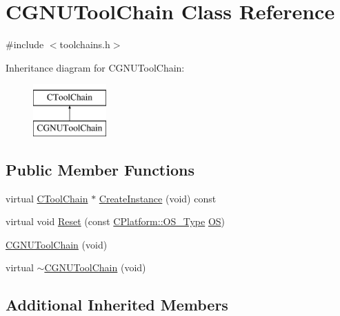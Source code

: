 \hypertarget{classCGNUToolChain}{\section{C\-G\-N\-U\-Tool\-Chain Class Reference}
\label{classCGNUToolChain}
}


{\ttfamily \#include $<$toolchains.\-h$>$}

Inheritance diagram for C\-G\-N\-U\-Tool\-Chain\-:\begin{figure}[H]
\begin{center}
\leavevmode
\includegraphics[height=2.000000cm]{d7/d26/classCGNUToolChain}
\end{center}
\end{figure}
\subsection*{Public Member Functions}
\begin{DoxyCompactItemize}
\item 
virtual \hyperlink{classCToolChain}{C\-Tool\-Chain} $\ast$ \hyperlink{classCGNUToolChain_a54793a226b09c673cce92a210d7fa471}{Create\-Instance} (void) const 
\item 
virtual void \hyperlink{classCGNUToolChain_ab989eae8567194074277acefff8eee2c}{Reset} (const \hyperlink{classCPlatform_a2fb735c63c53052f79629e338bb0f535}{C\-Platform\-::\-O\-S\-\_\-\-Type} \hyperlink{classCToolChain_abe4054d9081351e099163e2c53b260f8}{O\-S})
\item 
\hyperlink{classCGNUToolChain_aa5da10126f9b5a819ddc94d57e9947a4}{C\-G\-N\-U\-Tool\-Chain} (void)
\item 
virtual \hyperlink{classCGNUToolChain_a9f4fc82ffd121a68e43c95e5693295a8}{$\sim$\-C\-G\-N\-U\-Tool\-Chain} (void)
\end{DoxyCompactItemize}
\subsection*{Additional Inherited Members}



